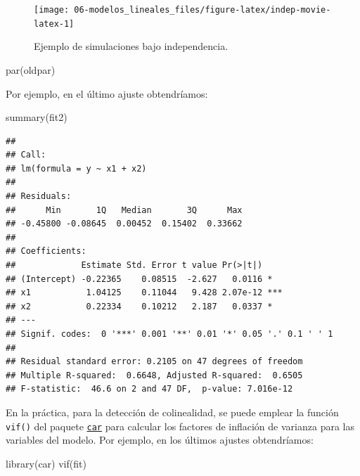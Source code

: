 \documentclass[
  spanish,
]{book}
\newenvironment{Shaded}{\begin{snugshade}}{\end{snugshade}}
\newcommand{\FunctionTok}[1]{\textcolor[rgb]{0.00,0.00,0.00}{#1}}
\newcommand{\NormalTok}[1]{#1}
\theoremstyle{break}
\theoremstyle{definition}
\theoremstyle{definition}
\theoremstyle{definition}
\theoremstyle{definition}
\theoremstyle{remark}
\begin{document}
\begin{figure}[!htb]

{\centering \texttt{[image: 06-modelos\_lineales\_files/figure-latex/indep-movie-latex-1]} 

}

\caption{Ejemplo de simulaciones bajo independencia.}\label{fig:indep-movie-latex}
\end{figure}

\begin{Shaded}
\begin{Highlighting}[]
\FunctionTok{par}\NormalTok{(oldpar)}
\end{Highlighting}
\end{Shaded}

Por ejemplo, en el último ajuste obtendríamos:

\begin{Shaded}
\begin{Highlighting}[]
\FunctionTok{summary}\NormalTok{(fit2)}
\end{Highlighting}
\end{Shaded}

\begin{verbatim}
## 
## Call:
## lm(formula = y ~ x1 + x2)
## 
## Residuals:
##      Min       1Q   Median       3Q      Max 
## -0.45800 -0.08645  0.00452  0.15402  0.33662 
## 
## Coefficients:
##             Estimate Std. Error t value Pr(>|t|)    
## (Intercept) -0.22365    0.08515  -2.627   0.0116 *  
## x1           1.04125    0.11044   9.428 2.07e-12 ***
## x2           0.22334    0.10212   2.187   0.0337 *  
## ---
## Signif. codes:  0 '***' 0.001 '**' 0.01 '*' 0.05 '.' 0.1 ' ' 1
## 
## Residual standard error: 0.2105 on 47 degrees of freedom
## Multiple R-squared:  0.6648, Adjusted R-squared:  0.6505 
## F-statistic:  46.6 on 2 and 47 DF,  p-value: 7.016e-12
\end{verbatim}

En la práctica, para la detección de colinealidad, se puede emplear la función
\texttt{vif()} del paquete \href{https://CRAN.R-project.org/package=car}{\texttt{car}} para calcular los factores de inflación de varianza para las variables del modelo.
Por ejemplo, en los últimos ajustes obtendríamos:

\begin{Shaded}
\begin{Highlighting}[]
\FunctionTok{library}\NormalTok{(car)}
\FunctionTok{vif}\NormalTok{(fit)}
\end{Highlighting}
\end{Shaded}
\end{document}
